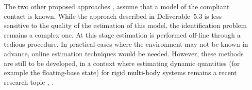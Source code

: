 \documentclass[12pt,a4paper,twoside]{article}
\begin{document}
The two other proposed approaches \cite{AzadIROS2015}, \cite{deliverable53} assume that a model of the compliant contact is known. While the approach described in Deliverable~5.3 \cite{deliverable53} is less sensitive to the quality of the estimation of this model, the identification problem remains a complex one. At this stage estimation is performed off-line through a tedious procedure. In practical cases where the environment may not be known in advance, online estimation techniques would be needed. However, these methods are still to be developed, in a context  where estimating dynamic quantities (for example the floating-base state) for rigid multi-body systems remains a recent research topic \cite{nori2015simultaneous}, \cite{rotella2015humanoid}.

\end{document}
